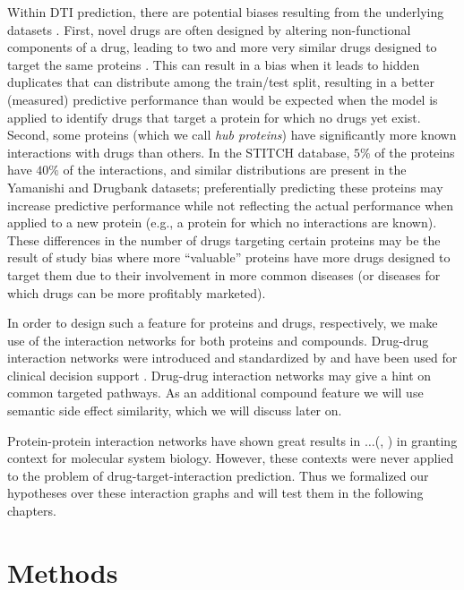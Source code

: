 \documentclass{bioinfo}
\renewcommand{\cite}{\citep}
\begin{document}
Within DTI prediction, there are potential biases resulting from the
underlying datasets \citep{Pahikkala2014}. First, novel drugs are
often designed by altering non-functional components of a drug,
leading to two and more very similar drugs designed to target the same
proteins \cite{Overington2006}. This can result in a bias when it
leads to hidden duplicates that can distribute among the train/test
split, resulting in a better (measured) predictive performance than
would be expected when the model is applied to identify drugs that
target a protein for which no drugs yet exist. Second, some proteins
(which we call \textit{hub proteins}) have significantly more known
interactions with drugs than others. In the STITCH database, $5\%$ of
the proteins have $40\%$ of the interactions, and similar
distributions are present in the Yamanishi and Drugbank
\cite{Drugbank2007, Drugbank2017} datasets; preferentially predicting
these proteins may increase predictive performance while not
reflecting the actual performance when applied to a new protein (e.g.,
a protein for which no interactions are known). These differences in
the number of drugs targeting certain proteins may be the result of
study bias where more ``valuable'' proteins have more drugs designed
to target them due to their involvement in more common diseases (or
diseases for which drugs can be more profitably marketed).



In order to design such a feature for proteins and drugs,
respectively, we make use of the interaction networks for both
proteins and compounds. Drug-drug interaction networks were introduced
and standardized by \citet{Boyce2015} and have been used for clinical
decision support \cite{Scheife2015}. Drug-drug interaction networks
may give a hint on common targeted pathways. As an additional compound
feature we will use semantic side effect similarity, which we will
discuss later on.

Protein-protein interaction networks have shown great results in
$\dots$(\cite{Vazquez2003}, \cite{Ackerman2019}) in granting context
for molecular system biology. However, these contexts were never
applied to the problem of drug-target-interaction prediction. Thus we
formalized our hypotheses over these interaction graphs and will test
them in the following chapters.

\enlargethispage{12pt}

\section{Methods}
\end{document}
